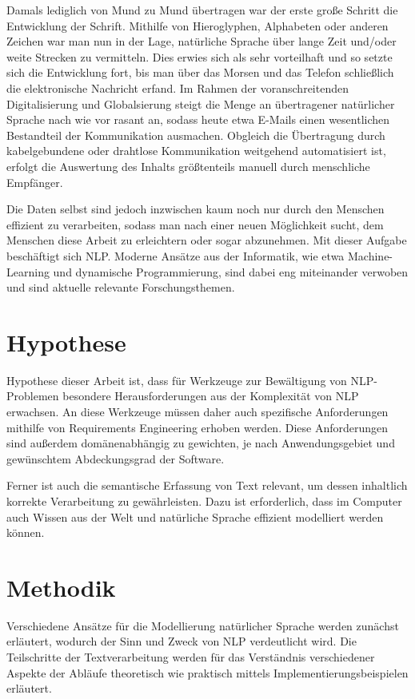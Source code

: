 \documentclass[12pt]{report}
\begin{document}
Damals lediglich von Mund zu Mund übertragen war der erste große Schritt die Entwicklung der Schrift. Mithilfe von Hieroglyphen, Alphabeten oder anderen Zeichen war man nun in der Lage, natürliche Sprache über lange Zeit und/oder weite Strecken zu vermitteln. Dies erwies sich als sehr vorteilhaft und so setzte sich die Entwicklung fort, bis man über das Morsen und das Telefon schließlich die elektronische Nachricht erfand. 
Im Rahmen der voranschreitenden Digitalisierung und Globalsierung steigt die Menge an übertragener natürlicher Sprache nach wie vor rasant an, sodass heute etwa E-Mails einen wesentlichen Bestandteil der Kommunikation ausmachen. Obgleich die Übertragung durch kabelgebundene oder drahtlose Kommunikation weitgehend automatisiert ist, erfolgt die Auswertung des Inhalts größtenteils manuell durch menschliche Empfänger.

Die Daten selbst sind jedoch inzwischen kaum noch nur durch den Menschen effizient zu verarbeiten, sodass man nach einer neuen Möglichkeit sucht, dem Menschen diese Arbeit zu erleichtern oder sogar abzunehmen. Mit dieser Aufgabe beschäftigt sich NLP. Moderne Ansätze aus der Informatik, wie etwa Machine-Learning und dynamische Programmierung, sind dabei eng miteinander verwoben und sind aktuelle relevante Forschungsthemen.

\section{Hypothese}
Hypothese dieser Arbeit ist, dass für Werkzeuge zur Bewältigung von NLP-Problemen besondere Herausforderungen aus der Komplexität von NLP erwachsen. An diese Werkzeuge müssen daher auch spezifische Anforderungen mithilfe von Requirements Engineering erhoben werden. Diese Anforderungen sind außerdem domänenabhängig zu gewichten, je nach Anwendungsgebiet und gewünschtem Abdeckungsgrad der Software.

Ferner ist auch die semantische Erfassung von Text relevant, um dessen inhaltlich korrekte Verarbeitung zu gewährleisten. Dazu ist erforderlich, dass im Computer auch Wissen aus der Welt und natürliche Sprache effizient modelliert werden können.

\section{Methodik}
Verschiedene Ansätze für die Modellierung natürlicher Sprache werden zunächst erläutert, wodurch der Sinn und Zweck von NLP verdeutlicht wird. Die Teilschritte der Textverarbeitung werden für das Verständnis verschiedener Aspekte der Abläufe theoretisch wie praktisch mittels Implementierungsbeispielen erläutert.
\end{document}

